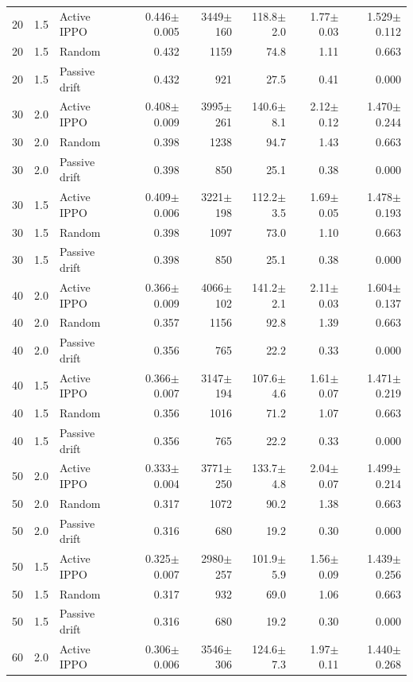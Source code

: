 \begin{table}[p]
{\begin{tabular}{@{}rrlrrrrr@{}}
\midrule
20 & 1.5 & Active IPPO & 0.446$\pm$0.005 & 3449$\pm$160 & 118.8$\pm$2.0 & 1.77$\pm$0.03 & 1.529$\pm$0.112 \\
20 & 1.5 & Random & 0.432 & 1159 & 74.8 & 1.11 & 0.663 \\
20 & 1.5 & Passive drift & 0.432 & 921 & 27.5 & 0.41 & 0.000 \\
\midrule
30 & 2.0 & Active IPPO & 0.408$\pm$0.009 & 3995$\pm$261 & 140.6$\pm$8.1 & 2.12$\pm$0.12 & 1.470$\pm$0.244 \\
30 & 2.0 & Random & 0.398 & 1238 & 94.7 & 1.43 & 0.663 \\
30 & 2.0 & Passive drift & 0.398 & 850 & 25.1 & 0.38 & 0.000 \\
\midrule
30 & 1.5 & Active IPPO & 0.409$\pm$0.006 & 3221$\pm$198 & 112.2$\pm$3.5 & 1.69$\pm$0.05 & 1.478$\pm$0.193 \\
30 & 1.5 & Random & 0.398 & 1097 & 73.0 & 1.10 & 0.663 \\
30 & 1.5 & Passive drift & 0.398 & 850 & 25.1 & 0.38 & 0.000 \\
\midrule
40 & 2.0 & Active IPPO & 0.366$\pm$0.009 & 4066$\pm$102 & 141.2$\pm$2.1 & 2.11$\pm$0.03 & 1.604$\pm$0.137 \\
40 & 2.0 & Random & 0.357 & 1156 & 92.8 & 1.39 & 0.663 \\
40 & 2.0 & Passive drift & 0.356 & 765 & 22.2 & 0.33 & 0.000 \\
\midrule
40 & 1.5 & Active IPPO & 0.366$\pm$0.007 & 3147$\pm$194 & 107.6$\pm$4.6 & 1.61$\pm$0.07 & 1.471$\pm$0.219 \\
40 & 1.5 & Random & 0.356 & 1016 & 71.2 & 1.07 & 0.663 \\
40 & 1.5 & Passive drift & 0.356 & 765 & 22.2 & 0.33 & 0.000 \\
\midrule
50 & 2.0 & Active IPPO & 0.333$\pm$0.004 & 3771$\pm$250 & 133.7$\pm$4.8 & 2.04$\pm$0.07 & 1.499$\pm$0.214 \\
50 & 2.0 & Random & 0.317 & 1072 & 90.2 & 1.38 & 0.663 \\
50 & 2.0 & Passive drift & 0.316 & 680 & 19.2 & 0.30 & 0.000 \\
\midrule
50 & 1.5 & Active IPPO & 0.325$\pm$0.007 & 2980$\pm$257 & 101.9$\pm$5.9 & 1.56$\pm$0.09 & 1.439$\pm$0.256 \\
50 & 1.5 & Random & 0.317 & 932 & 69.0 & 1.06 & 0.663 \\
50 & 1.5 & Passive drift & 0.316 & 680 & 19.2 & 0.30 & 0.000 \\
\midrule
60 & 2.0 & Active IPPO & 0.306$\pm$0.006 & 3546$\pm$306 & 124.6$\pm$7.3 & 1.97$\pm$0.11 & 1.440$\pm$0.268 \\

\end{tabular}}
\end{table}

